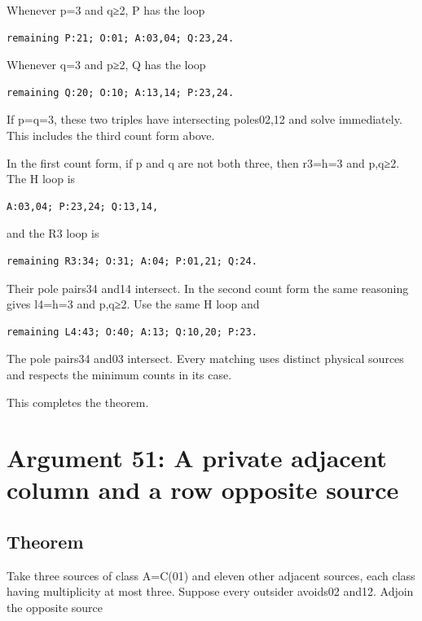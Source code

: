 \documentclass[
  10pt,
]{article}
\begin{document}
Whenever p=3 and q≥2, P has the loop

\begin{verbatim}
remaining P:21; O:01; A:03,04; Q:23,24.
\end{verbatim}

Whenever q=3 and p≥2, Q has the loop

\begin{verbatim}
remaining Q:20; O:10; A:13,14; P:23,24.
\end{verbatim}

If p=q=3, these two triples have intersecting poles02,12 and solve
immediately. This includes the third count form above.

In the first count form, if p and q are not both three, then r3=h=3 and
p,q≥2. The H loop is

\begin{verbatim}
A:03,04; P:23,24; Q:13,14,
\end{verbatim}

and the R3 loop is

\begin{verbatim}
remaining R3:34; O:31; A:04; P:01,21; Q:24.
\end{verbatim}

Their pole pairs34 and14 intersect. In the second count form the same
reasoning gives l4=h=3 and p,q≥2. Use the same H loop and

\begin{verbatim}
remaining L4:43; O:40; A:13; Q:10,20; P:23.
\end{verbatim}

The pole pairs34 and03 intersect. Every matching uses distinct physical
sources and respects the minimum counts in its case.

This completes the theorem.

\hypertarget{arg-51}{%
\section{Argument 51: A private adjacent column and a row opposite
source}\label{arg-51}}

\hypertarget{theorem-3}{%
\subsection*{Theorem}\label{theorem-3}}

Take three sources of class A=C(01) and eleven other adjacent sources,
each class having multiplicity at most three. Suppose every outsider
avoids02 and12. Adjoin the opposite source
\end{document}
